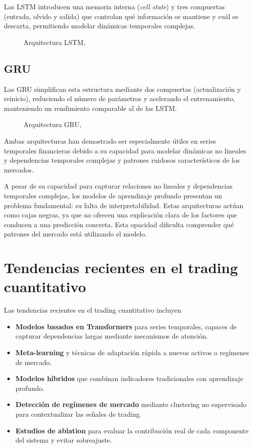 Las LSTM introducen una memoria interna (\textit{cell state}) y tres compuertas (entrada, olvido y salida) que controlan qué información se mantiene y
cuál se descarta, permitiendo modelar dinámicas temporales complejas.

\begin{figure}[H]
    \centering
    
    \caption{Arquitectura LSTM, \cite{nntikz}}
    \label{fig_lstm}
\end{figure}

\subsection{GRU}

Las GRU simplifican esta estructura mediante dos compuertas (actualización y reinicio), reduciendo el número de parámetros y acelerando el
entrenamiento, manteniendo un rendimiento comparable al de las LSTM.

\begin{figure}[H]
    \centering
    
    \caption{Arquitectura GRU, \cite{nntikz}}
    \label{fig_gru}
\end{figure}

Ambas arquitecturas han demostrado ser especialmente útiles en series temporales financieras debido a su capacidad para modelar dinámicas no lineales
y dependencias temporales complejas y patrones ruidosos característicos de los mercados.

A pesar de su capacidad para capturar relaciones no lineales y dependencias temporales complejas, los modelos de aprendizaje profundo presentan un
problema fundamental: su falta de interpretabilidad. Estas arquitecturas actúan como cajas negras, ya que no ofrecen una explicación clara de los
factores que conducen a una predicción concreta. Esta opacidad dificulta comprender qué patrones del mercado está utilizando el modelo.

\section{Tendencias recientes en el trading cuantitativo}

Las tendencias recientes en el trading cuantitativo incluyen

\begin{itemize}
    \item \textbf{Modelos basados en Transformers} para series temporales, capaces de capturar dependencias largas mediante mecanismos de atención.
    \item \textbf{Meta-learning} y técnicas de adaptación rápida a nuevos activos o regímenes de mercado.
    \item \textbf{Modelos híbridos} que combinan indicadores tradicionales con aprendizaje profundo.
    \item \textbf{Detección de regímenes de mercado} mediante clustering no supervisado para contextualizar las señales de trading.
    \item \textbf{Estudios de ablation} para evaluar la contribución real de cada componente del sistema y evitar sobreajuste.
\end{itemize}

